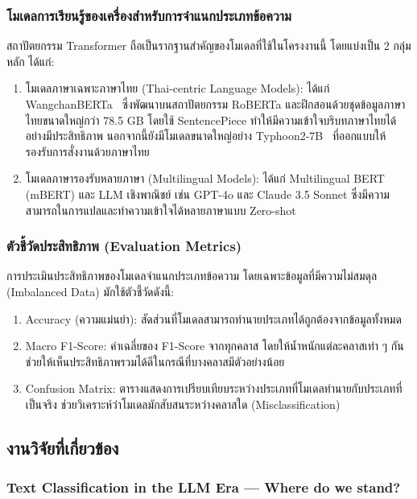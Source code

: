 \subsubsection{โมเดลการเรียนรู้ของเครื่องสำหรับการจำแนกประเภทข้อความ}
สถาปัตยกรรม Transformer ถือเป็นรากฐานสำคัญของโมเดลที่ใช้ในโครงงานนี้ โดยแบ่งเป็น 2 กลุ่มหลัก ได้แก่:
\begin{enumerate}[label=(\arabic*)]
    \item โมเดลภาษาเฉพาะภาษาไทย (Thai-centric Language Models): ได้แก่ WangchanBERTa~\cite{lowphansirikul2021wangchanberta} ซึ่งพัฒนาบนสถาปัตยกรรม RoBERTa และฝึกสอนด้วยชุดข้อมูลภาษาไทยขนาดใหญ่กว่า 78.5 GB โดยใช้ SentencePiece ทำให้มีความเข้าใจบริบทภาษาไทยได้อย่างมีประสิทธิภาพ นอกจากนี้ยังมีโมเดลขนาดใหญ่อย่าง Typhoon2-7B~\cite{sriphon2025} ที่ออกแบบให้รองรับการสั่งงานด้วยภาษาไทย
    \item โมเดลภาษารองรับหลายภาษา (Multilingual Models): ได้แก่ Multilingual BERT (mBERT) และ LLM เชิงพาณิชย์ เช่น GPT-4o และ Claude 3.5 Sonnet ซึ่งมีความสามารถในการแปลและทำความเข้าใจได้หลายภาษาแบบ Zero-shot 
\end{enumerate}

\subsubsection{ตัวชี้วัดประสิทธิภาพ (Evaluation Metrics)}
การประเมินประสิทธิภาพของโมเดลจำแนกประเภทข้อความ โดยเฉพาะข้อมูลที่มีความไม่สมดุล (Imbalanced Data) มักใช้ตัวชี้วัดดังนี้:
\begin{enumerate}[label=(\arabic*)]
    \item Accuracy (ความแม่นยำ): สัดส่วนที่โมเดลสามารถทำนายประเภทได้ถูกต้องจากข้อมูลทั้งหมด
    \item Macro F1-Score: ค่าเฉลี่ยของ F1-Score จากทุกคลาส โดยให้น้ำหนักแต่ละคลาสเท่า ๆ กัน ช่วยให้เห็นประสิทธิภาพรวมได้ดีในกรณีที่บางคลาสมีตัวอย่างน้อย
    \item Confusion Matrix: ตารางแสดงการเปรียบเทียบระหว่างประเภทที่โมเดลทำนายกับประเภทที่เป็นจริง ช่วยวิเคราะห์ว่าโมเดลมักสับสนระหว่างคลาสใด (Misclassification)
\end{enumerate}

\subsection{งานวิจัยที่เกี่ยวข้อง}

\subsubsection{Text Classification in the LLM Era — Where do we stand? \cite{vajjala2024}}

